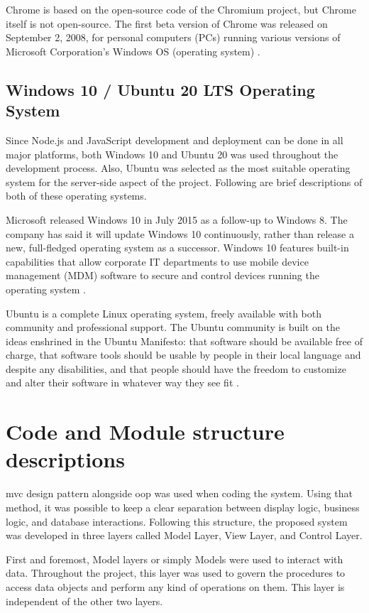 \documentclass[12pt]{report}
\begin{document}
Chrome is based on the open-source code of the Chromium project, but Chrome itself is not open-source. The first beta version of Chrome was released on September 2, 2008, for personal computers (PCs) running various versions of Microsoft Corporation's Windows OS (operating system) \cite{hosch_2020_google_chrome}.

\subsection{Windows 10 / Ubuntu 20 LTS Operating System}
Since Node.js and JavaScript development and deployment can be done in all major platforms, both Windows 10 and Ubuntu 20 was used throughout the development process. Also, Ubuntu was selected as the most suitable operating system for the server-side aspect of the project. Following are brief descriptions of both of these operating systems.

Microsoft released Windows 10 in July 2015 as a follow-up to Windows 8. The company has said it will update Windows 10 continuously, rather than release a new, full-fledged operating system as a successor. Windows 10 features built-in capabilities that allow corporate IT departments to use mobile device management (MDM) software to secure and control devices running the operating system \cite{margaretrouse_2017_windows10}.

Ubuntu is a complete Linux operating system, freely available with both community and professional support. The Ubuntu community is built on the ideas enshrined in the Ubuntu Manifesto: that software should be available free of charge, that software tools should be usable by people in their local language and despite any disabilities, and that people should have the freedom to customize and alter their software in whatever way they see fit \cite{ubuntu_2019_introduction}.


\section{Code and Module structure descriptions}
\acrshort{mvc} design pattern alongside \acrshort{oop} was used when coding the system. Using that method, it was possible to keep a clear separation between display logic, business logic, and database interactions. Following this structure, the proposed system was developed in three layers called Model Layer, View Layer, and Control Layer.

First and foremost, Model layers or simply Models were used to interact with data. Throughout the project, this layer was used to govern the procedures to access data objects and perform any kind of operations on them. This layer is independent of the other two layers.
\end{document}

